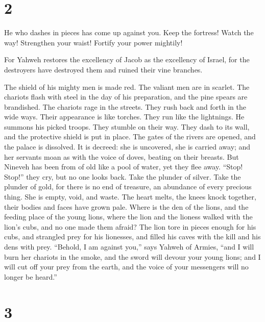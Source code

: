 \hypertarget{section-1}{%
\section{2}\label{section-1}}

 He who dashes in pieces has come up against you. Keep the
fortress! Watch the way! Strengthen your waist! Fortify your power
mightily!

 For Yahweh restores the excellency of Jacob as the
excellency of Israel, for the destroyers have destroyed them and ruined
their vine branches.

 The shield of his mighty men is made red. The valiant men
are in scarlet. The chariots flash with steel in the day of his
preparation, and the pine spears are brandished.  The
chariots rage in the streets. They rush back and forth in the wide ways.
Their appearance is like torches. They run like the lightnings.
 He summons his picked troops. They stumble on their way.
They dash to its wall, and the protective shield is put in place.
 The gates of the rivers are opened, and the palace is
dissolved.  It is decreed: she is uncovered, she is carried
away; and her servants moan as with the voice of doves, beating on their
breasts.  But Nineveh has been from of old like a pool of
water, yet they flee away. ``Stop! Stop!'' they cry, but no one looks
back.  Take the plunder of silver. Take the plunder of gold,
for there is no end of treasure, an abundance of every precious thing.
 She is empty, void, and waste. The heart melts, the knees
knock together, their bodies and faces have grown pale. 
Where is the den of the lions, and the feeding place of the young lions,
where the lion and the lioness walked with the lion's cubs, and no one
made them afraid?  The lion tore in pieces enough for his
cubs, and strangled prey for his lionesses, and filled his caves with
the kill and his dens with prey.  ``Behold, I am against
you,'' says Yahweh of Armies, ``and I will burn her chariots in the
smoke, and the sword will devour your young lions; and I will cut off
your prey from the earth, and the voice of your messengers will no
longer be heard.''

\hypertarget{section-2}{%
\section{3}\label{section-2}}

